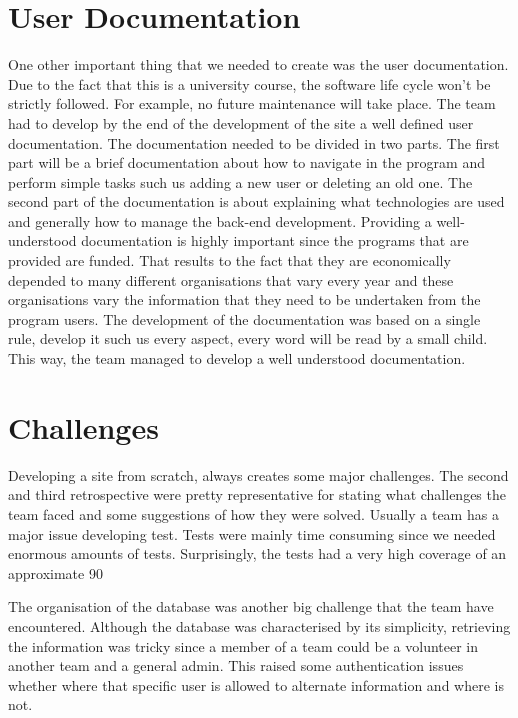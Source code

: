 \documentclass{l3proj}
\begin{document}
\section{User Documentation}
\label{sec:user_doc}

One other important thing that we needed to create was the user documentation. Due to the fact that this is a university course, the software life cycle won't be strictly followed. For example, no future maintenance will take place. The team had to develop by the end of the development of the site a well defined user documentation. The documentation needed to be divided in two parts. The first part will be a brief documentation about how to navigate in the program and perform simple tasks such us adding a new user or deleting an old one. The second part of the documentation is about explaining what technologies are used and generally how to manage the back-end development. Providing a well-understood documentation is highly important since the programs that are provided are funded. That results to the fact that they are economically depended to many different organisations that vary every year and these organisations vary the information that they need to be undertaken from the program users. The development of the documentation was based on a single rule, develop it such us every aspect, every word will be read by a small child. This way, the team managed to develop a well understood documentation.




\section{Challenges}
\label{challenges}

Developing a site from scratch, always creates some major challenges. The second and third retrospective were pretty representative for stating what challenges the team faced and some suggestions of how they were solved. Usually a team has a major issue developing test. Tests were mainly time consuming since we needed enormous amounts of tests. Surprisingly, the tests had a very high coverage of an approximate 90%

The organisation of the database was another big challenge that the team have encountered. Although the database was characterised by its simplicity, retrieving the information was tricky since a member of a team could be a volunteer in another team and a general admin. This raised some authentication issues whether where that specific user is allowed to alternate information and where is not.
\end{document}
